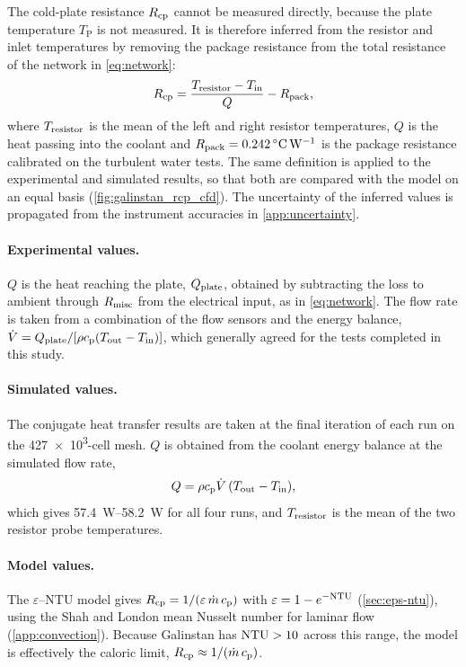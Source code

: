 The cold-plate resistance $R_{\mathrm{cp}}$ cannot be measured directly, because the plate
temperature $T_\mathrm{P}$ is not measured. It is therefore inferred from the
resistor and inlet temperatures by removing the package resistance from the
total resistance of the network in \cref{eq:network}:
\begin{equation}
  R_{\mathrm{cp}} = \frac{T_{\mathrm{resistor}} - T_{\mathrm{in}}}{Q} - R_{\mathrm{pack}},
  \label{eq:rcp-inferred}
\end{equation}
where $T_{\mathrm{resistor}}$ is the mean of the left and right resistor temperatures, $Q$ is
the heat passing into the coolant and $R_{\mathrm{pack}} = \SI{0.242}{\celsius\per\watt}$
is the package resistance calibrated on the turbulent water tests. The same
definition is applied to the experimental and simulated results, so that both
are compared with the model on an equal basis (\cref{fig:galinstan_rcp_cfd}).
The uncertainty of the inferred values is propagated from the instrument
accuracies in \cref{app:uncertainty}.

\paragraph{Experimental values.} $Q$ is the heat reaching the plate,
$Q_{\mathrm{plate}}$, obtained by subtracting the loss to ambient through $R_{\mathrm{misc}}$ from the
electrical input, as in \cref{eq:network}. The flow rate is taken from a
combination of the flow sensors and the energy balance,
$\dot{V} = Q_{\mathrm{plate}} / [\rho c_{\mathrm{p}}(T_{\mathrm{out}} - T_{\mathrm{in}})]$, which generally agreed for the tests
completed in this study.

\paragraph{Simulated values.} The conjugate heat transfer results are taken at
the final iteration of each run on the \num{427e3}-cell mesh. $Q$ is obtained
from the coolant energy balance at the simulated flow rate,
\begin{equation}
  Q = \rho c_{\mathrm{p}}\dot{V}\,(T_{\mathrm{out}} - T_{\mathrm{in}}),
\end{equation}
which gives \SIrange{57.4}{58.2}{\watt} for all four runs, and $T_{\mathrm{resistor}}$ is the
mean of the two resistor probe temperatures.

\paragraph{Model values.} The $\varepsilon$--NTU model gives
$R_{\mathrm{cp}} = 1/(\varepsilon\,\dot{m}\,c_{\mathrm{p}})$ with $\varepsilon = 1 - e^{-\mathrm{NTU}}$
(\cref{sec:eps-ntu}), using the Shah and London mean Nusselt number for laminar
flow (\cref{app:convection}). Because Galinstan has $\mathrm{NTU} > 10$ across this
range, the model is effectively the caloric limit, $R_{\mathrm{cp}} \approx 1/(\dot{m}\,c_{\mathrm{p}})$.

